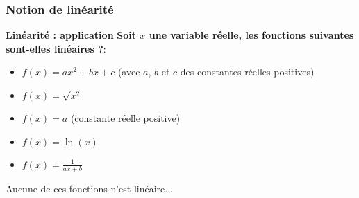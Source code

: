 \documentclass{beamer}
\begin{document}
\begin{frame}
\frametitle{Notion de linéarité}
 \textbf{Linéarité : application}
\textbf{Soit $x$ une variable réelle, les fonctions suivantes sont-elles linéaires ?}:
 \vspace{0.5cm}
\begin{itemize}
\item<2-> $f(x) = a x^2 + b x + c$ (avec $a$, $b$ et $c$ des constantes réelles positives)
\vspace{0.2cm}
\item<3-> $f(x) = \sqrt{x^2}$
\vspace{0.2cm}
\item<4-> $f(x) = a$ (constante réelle positive)
\vspace{0.2cm}
\item<5-> $f(x) = \ln(x)$
\vspace{0.2cm}
\item<6-> $f(x) = \frac{1}{a x + b}$
\end{itemize}
\vspace{1cm}
{
Aucune de ces fonctions n'est linéaire...
}
\end{frame}
\end{document}

